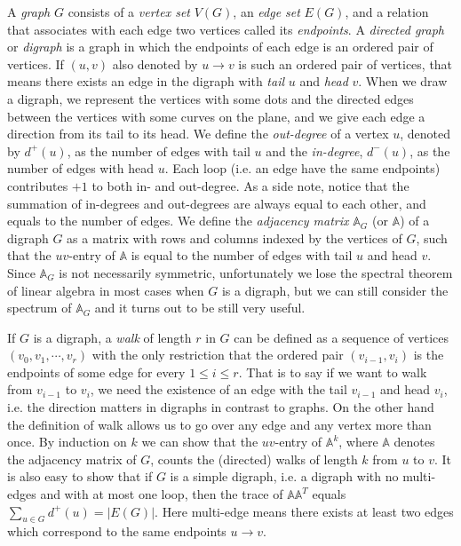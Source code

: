 \documentclass[11pt,reqno]{amsart}
\begin{document}
A \emph{graph} $G$ consists of a \emph{vertex set} $V(G)$, an \emph{edge set} $E(G)$, and a relation that associates with each edge two vertices called its \emph{endpoints}. A \emph{directed graph} or \emph{digraph} is a graph in which the endpoints of each edge is an ordered pair of vertices. If $(u,v)$ also denoted by $u \rightarrow v$ is such an ordered pair of vertices, that means there exists an edge in the digraph with \emph{tail} $u$ and \emph{head} $v$. When we draw a digraph, we represent the vertices with some dots and the directed edges between the vertices with some curves on the plane, and we give each edge a direction from its tail to its head. We define the \emph{out-degree} of a vertex $u$, denoted by $d^{+}(u)$, as the number of edges with tail $u$ and the \emph{in-degree}, $d^{-}(u)$, as the number of edges with head $u$. Each loop (i.e. an edge have the same endpoints) contributes $+1$ to both in- and out-degree. As a side note, notice that the summation of in-degrees and out-degrees are always equal to each other, and equals to the number of edges. We define the \emph{adjacency matrix} $\mathbb{A}_{G}$ (or $\mathbb{A}$) of a digraph $G$ as a matrix with rows and columns indexed by the vertices of $G$, such that the $uv$-entry of $\mathbb{A}$ is equal to the number of edges with tail $u$ and head $v$. Since $\mathbb{A}_{G}$ is not necessarily symmetric, unfortunately we lose the spectral theorem of linear algebra in most cases when $G$ is a digraph, but we can still consider the spectrum of $\mathbb{A}_{G}$ and it turns out to be still very useful.

If $G$ is a digraph, a \emph{walk} of length $r$ in $G$ can be defined as a sequence of vertices $( v_0, v_1, \cdots, v_r)$ with the only restriction that the ordered pair $(v_{i-1},v_{i})$ is the endpoints of some edge for every $1 \leqslant i \leqslant r$. That is to say if we want to walk from $v_{i-1}$ to $v_{i}$, we need the existence of an edge with the tail $v_{i-1}$ and head $v_{i}$, i.e. the direction matters in digraphs in contrast to graphs. On the other hand the definition of walk allows us to go over any edge and any vertex more than once. By induction on $k$ we can show that the $uv$-entry of $\mathbb{A}^k$, where $\mathbb{A}$ denotes the adjacency matrix of $G$, counts the (directed) walks of length $k$ from $u$ to $v$. It is also easy to show that if $G$ is a simple digraph, i.e. a digraph with no multi-edges and with at most one loop, then the trace of $\mathbb{A} \mathbb{A}^{T}$ equals $\sum_{u \in G} d^{+}(u)=\vert E(G) \vert$. Here multi-edge means there exists at least two edges which correspond to the same endpoints $u \rightarrow v$. 
\end{document}
